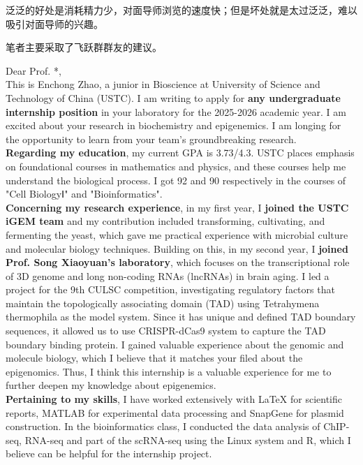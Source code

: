 泛泛的好处是消耗精力少，对面导师浏览的速度快；但是坏处就是太过泛泛，难以吸引对面导师的兴趣。

笔者主要采取了飞跃群群友的建议。

\begin{presentbox}
\noindent Dear Prof. *,\\[0.5ex]

\noindent This is Enchong Zhao, a junior in Bioscience at University of Science and Technology of China (USTC). I am writing to apply for \textbf{any undergraduate internship position} in your laboratory for the 2025-2026 academic year. I am excited about your research in biochemistry and epigenemics. I am longing for the opportunity to learn from your team’s groundbreaking research.\\[0.5ex]

\noindent \textbf{Regarding my education}, my current GPA is 3.73/4.3. USTC places emphasis on foundational courses in mathematics and physics, and these courses help me understand the biological process. I got 92 and 90 respectively in the courses of "Cell BiologyⅠ" and "Bioinformatics".\\[0.5ex]

\noindent \textbf{Concerning my research experience}, in my first year, I \textbf{joined the USTC iGEM team} and my contribution included transforming, cultivating, and fermenting the yeast, which gave me practical experience with microbial culture and molecular biology techniques. Building on this, in my second year, I \textbf{joined Prof. Song Xiaoyuan’s laboratory}, which focuses on the transcriptional role of 3D genome and long non-coding RNAs (lncRNAs) in brain aging. I led a project for the 9th CULSC competition, investigating regulatory factors that maintain the topologically associating domain (TAD) using Tetrahymena thermophila as the model system. Since it has unique and defined TAD boundary sequences, it allowed us to use CRISPR-dCas9 system to capture the TAD boundary binding protein. I gained valuable experience about the genomic and molecule biology, which I believe that it matches your filed about the epigenomics. Thus, I think this internship is a valuable experience for me to further deepen my knowledge about epigenemics.\\[0.5ex]

\noindent \textbf{Pertaining to my skills}, I have worked extensively with LaTeX for scientific reports, MATLAB for experimental data processing and SnapGene for plasmid construction. In the bioinformatics class, I conducted the data analysis of ChIP-seq, RNA-seq and part of the scRNA-seq using the Linux system and R, which I believe can be helpful for the internship project.\\[0.5ex]


\end{presentbox}
